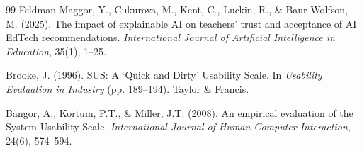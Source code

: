 \documentclass[12pt,a4paper,oneside,openany]{report}
\begin{document}
\begin{thebibliography}{99}
Feldman-Maggor, Y., Cukurova, M., Kent, C., Luckin, R., \& Baur-Wolfson, M. (2025). The impact of explainable AI on teachers' trust and acceptance of AI EdTech recommendations. \textit{International Journal of Artificial Intelligence in Education}, 35(1), 1--25.

Brooke, J. (1996). SUS: A `Quick and Dirty' Usability Scale. In \textit{Usability Evaluation in Industry} (pp. 189--194). Taylor \& Francis.

Bangor, A., Kortum, P.T., \& Miller, J.T. (2008). An empirical evaluation of the System Usability Scale. \textit{International Journal of Human-Computer Interaction}, 24(6), 574--594.

\end{thebibliography}
\end{document}
